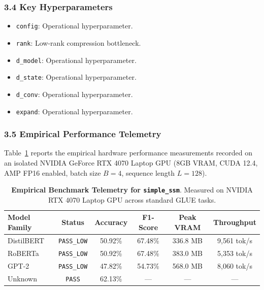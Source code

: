 \subsubsection*{3.4 Key Hyperparameters}
\begin{itemize}
    \item \texttt{config}: Operational hyperparameter.
    \item \texttt{rank}: Low-rank compression bottleneck.
    \item \texttt{d\_model}: Operational hyperparameter.
    \item \texttt{d\_state}: Operational hyperparameter.
    \item \texttt{d\_conv}: Operational hyperparameter.
    \item \texttt{expand}: Operational hyperparameter.
\end{itemize}

\subsubsection*{3.5 Empirical Performance Telemetry}
Table~\ref{tab:telemetry_simple_ssm} reports the empirical hardware performance measurements recorded on an isolated NVIDIA GeForce RTX 4070 Laptop GPU (8GB VRAM, CUDA 12.4, AMP FP16 enabled, batch size $B=4$, sequence length $L=128$).

\begin{table}[h]
\centering
\small
\caption{\textbf{Empirical Benchmark Telemetry for \texttt{simple\_ssm}}. Measured on NVIDIA RTX 4070 Laptop GPU across standard GLUE tasks.}
\label{tab:telemetry_simple_ssm}
\begin{tabular*}{\columnwidth}{@{\extracolsep{\fill}}lccccc}
\toprule
\textbf{Model Family} & \textbf{Status} & \textbf{Accuracy} & \textbf{F1-Score} & \textbf{Peak VRAM} & \textbf{Throughput} \\
\midrule
DistilBERT & \texttt{PASS\_LOW} & 50.92\% & 67.48\% & 336.8 MB & 9,561 tok/s \\
RoBERTa & \texttt{PASS\_LOW} & 50.92\% & 67.48\% & 383.0 MB & 5,353 tok/s \\
GPT-2 & \texttt{PASS\_LOW} & 47.82\% & 54.73\% & 568.0 MB & 8,060 tok/s \\
Unknown & \texttt{PASS} & 62.13\% & --- & --- & --- \\
\bottomrule
\end{tabular*}
\end{table}

